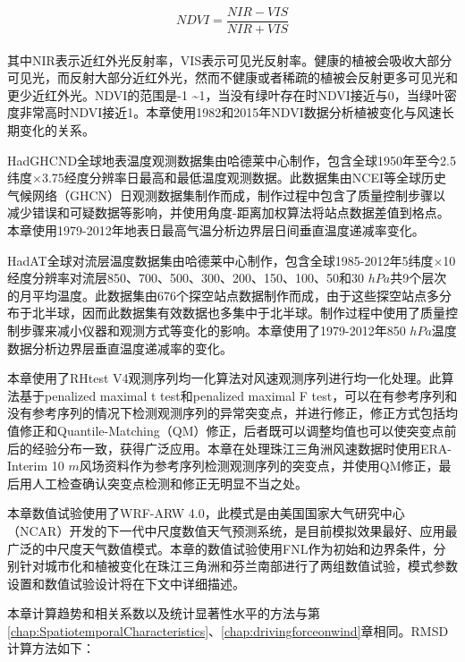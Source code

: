 \begin{equation} \label{eq:ndvi}
NDVI = \frac{NIR - VIS}{NIR + VIS}
\end{equation} ~\\
其中NIR表示近红外光反射率，VIS表示可见光反射率。健康的植被会吸收大部分可见光，而反射大部分近红外光，然而不健康或者稀疏的植被会反射更多可见光和更少近红外光。NDVI的范围是-1 \textasciitilde 1，当没有绿叶存在时NDVI接近与0，当绿叶密度非常高时NDVI接近1。本章使用1982和2015年NDVI数据分析植被变化与风速长期变化的关系。

HadGHCND全球地表温度观测数据集\citep{caesar2006large-scale}由哈德莱中心制作，包含全球1950年至今2.5纬度$\times$3.75经度分辨率日最高和最低温度观测数据。此数据集由NCEI等全球历史气候网络（GHCN）日观测数据集制作而成，制作过程中包含了质量控制步骤以减少错误和可疑数据等影响，并使用角度-距离加权算法将站点数据差值到格点。本章使用1979-2012年地表日最高气温分析边界层日间垂直温度递减率变化。

HadAT全球对流层温度数据集\citep{thorne2005revisiting}由哈德莱中心制作，包含全球1985-2012年5纬度$\times$10经度分辨率对流层850、700、500、300、200、150、100、50和30 $hPa$共9个层次的月平均温度。此数据集由676个探空站点数据制作而成，由于这些探空站点多分布于北半球，因而此数据集有效数据也多集中于北半球。制作过程中使用了质量控制步骤来减小仪器和观测方式等变化的影响。本章使用了1979-2012年850 $hPa$温度数据分析边界层垂直温度递减率的变化。

本章使用了RHtest V4观测序列均一化算法\citep{wang2014rhtests}对风速观测序列进行均一化处理。此算法基于penalized maximal t test\citep{wang2007penalized}和penalized maximal F test\citep{wang2008penalized}，可以在有参考序列和没有参考序列的情况下检测观测序列的异常突变点，并进行修正，修正方式包括均值修正和Quantile-Matching（QM）修正，后者既可以调整均值也可以使突变点前后的经验分布一致\citep{wang2010new}，获得广泛应用\citep{vincent2012second, baule2014climatology, yang2019causes}。本章在处理珠江三角洲风速数据时使用ERA-Interim 10 $m$风场资料作为参考序列检测观测序列的突变点，并使用QM修正，最后用人工检查确认突变点检测和修正无明显不当之处。

本章数值试验使用了WRF-ARW 4.0\citep{skamarock2019description}，此模式是由美国国家大气研究中心（NCAR）开发的下一代中尺度数值天气预测系统，是目前模拟效果最好、应用最广泛的中尺度天气数值模式。本章的数值试验使用FNL作为初始和边界条件，分别针对城市化和植被变化在珠江三角洲和芬兰南部进行了两组数值试验，模式参数设置和数值试验设计将在下文中详细描述。

本章计算趋势和相关系数以及统计显著性水平的方法与第\ref{chap:SpatiotemporalCharacteristics}、\ref{chap:drivingforceonwind}章相同。RMSD计算方法如下：

